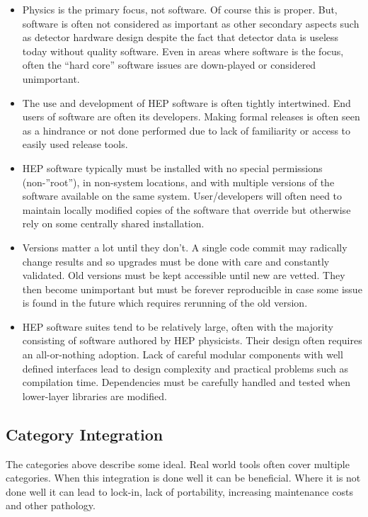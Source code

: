 \begin{itemize}
\item Physics is the primary focus, not software.  Of course this is
  proper.  But, software is often not considered as important as other
  secondary aspects such as detector hardware design despite the fact
  that detector data is useless today without quality software.  Even
  in areas where software is the focus, often the ``hard core''
  software issues are down-played or considered unimportant.
\item The use and development of HEP software is often tightly
  intertwined.  End users of software are often its developers.
  Making formal releases is often seen as a hindrance or not done
  performed due to lack of familiarity or access to easily used
  release tools.
\item HEP software typically must be installed with no special
  permissions (non-''root''), in non-system locations, and with
  multiple versions of the software available on the same system.
  User/developers will often need to maintain locally modified copies
  of the software that override but otherwise rely on some centrally
  shared installation.
\item Versions matter a lot until they don't.  A single code commit
  may radically change results and so upgrades must be done with care
  and constantly validated.  Old versions must be kept accessible
  until new are vetted.  They then become unimportant but must be
  forever reproducible in case some issue is found in the future which
  requires rerunning of the old version.
\item HEP software suites tend to be relatively large, often with the
  majority consisting of software authored by HEP physicists.  Their
  design often requires an all-or-nothing adoption.  Lack of careful
  modular components with well defined interfaces lead to design
  complexity and practical problems such as compilation time.
  Dependencies must be carefully handled and tested when lower-layer
  libraries are modified.
\end{itemize}



\subsection{Category Integration}

The categories above describe some ideal.  Real world tools often
cover multiple categories.  When this integration is done well it can
be beneficial.  Where it is not done well it can lead to  lock-in,
lack of portability, increasing maintenance costs and other pathology.

